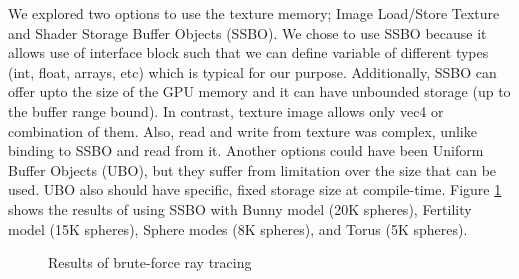 \documentclass[a4paper,10pt]{article}
\begin{document}
We explored two options to use the texture memory; Image Load/Store Texture and Shader Storage Buffer Objects (SSBO). We chose to use SSBO because it allows use of interface block such that we can define variable of different types (int, float, arrays, etc) which is typical for our purpose. Additionally, SSBO can offer upto the size of the GPU memory and it can have unbounded storage (up to the buffer range bound). In contrast, texture image allows only vec4 or combination of them. Also, read and write from texture was complex, unlike binding to SSBO and read from it. Another options could have been Uniform Buffer Objects (UBO), but they suffer from limitation over the size that can be used. UBO also should have specific, fixed storage size at compile-time. Figure \ref{fig:brute} shows the results of using SSBO with Bunny model (20K spheres), Fertility model (15K spheres), Sphere modes (8K spheres), and Torus (5K spheres).

\begin{figure}[tbh]
 \centering     
   
     \caption{Results of brute-force ray tracing}
   \label{fig:brute}
\end{figure} 
   
\end{document}
